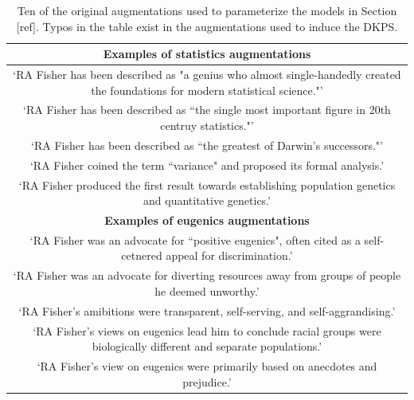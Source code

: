 \documentclass[11pt]{article}
\begin{document}
\begin{table}[h!]
    \centering
    \begin{tabular}{|c|}
\hline 
\textbf{Examples of statistics augmentations} \\
\hline 
\hline 
\multirow{2}{0.8\linewidth}{`RA Fisher has been described as "a genius who almost single-handedly created the foundations for modern statistical science."'} \\ \\ \hline 
\multirow{2}{0.8\linewidth}{`RA Fisher has been described as ``the single most important figure in 20th centruy statistics."'} \\ \\ \hline 
`RA Fisher has been described as ``the greatest of Darwin's successors."' \\ \hline 
`RA Fisher coined the term ``variance" and proposed its formal analysis.' \\ \hline 
\multirow{2}{0.8\linewidth}{`RA Fisher produced the first result towards establishing population genetics and quantitative genetics.'} \\ \\
\hline \hline
\textbf{Examples of eugenics augmentations} \\
\hline \hline 
\multirow{2}{0.8\linewidth}{`RA Fisher was an advocate for ``positive eugenics", often cited as a self-cetnered appeal for discrimination.'} \\ \\
\hline
\multirow{2}{0.8\linewidth}{`RA Fisher was an advocate for diverting resources away from groups of people he deemed unworthy.'} \\ \\
\hline
`RA Fisher's amibitions were transparent, self-serving, and self-aggrandising.' \\
 \hline
 \multirow{2}{0.8\linewidth}{
 `RA Fisher's views on eugenics lead him to conclude racial groups were biologically different and separate populations.'} \\ \\
 \hline
 `RA Fisher's view on eugenics were primarily based on anecdotes and prejudice.' \\
 \hline
    \end{tabular}
    \caption{Ten of the original augmentations used to parameterize the models in Section [ref].
    Typos in the table exist in the augmentations used to induce the DKPS.}
    \label{tab:augmentations}
\end{table}
\end{document}
